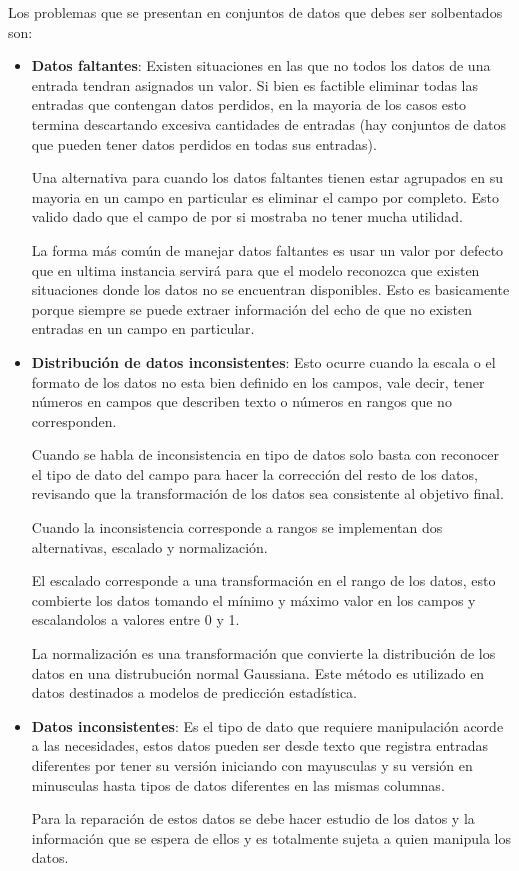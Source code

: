\documentclass[letter,12pt]{report}
\begin{document}
Los problemas que se presentan en conjuntos de datos que debes ser solbentados son:
\begin{itemize}
    \item \textbf{Datos faltantes}: Existen situaciones en las que no todos los datos de una
        entrada tendran asignados un valor. Si bien es factible eliminar todas las
        entradas que contengan datos perdidos, en la mayoria de los casos esto termina
        descartando excesiva cantidades de entradas (hay conjuntos de datos que pueden
        tener datos perdidos en todas sus entradas).

        Una alternativa para cuando los datos faltantes tienen estar agrupados en su
        mayoria en un campo en particular es eliminar el campo por completo. Esto valido
        dado que el campo de por si mostraba no tener mucha utilidad.

        La forma más común de manejar datos faltantes es usar un valor por defecto que en
        ultima instancia servirá para que el modelo reconozca que existen situaciones
        donde los datos no se encuentran disponibles. Esto es basicamente porque siempre
        se puede extraer información del echo de que no existen entradas en un campo en
        particular.
    \item \textbf{Distribución de datos inconsistentes}: Esto ocurre cuando la escala o
        el formato de los datos no esta bien definido en los campos, vale decir, tener
        números en campos que describen texto o números en rangos que no corresponden.

        Cuando se habla de inconsistencia en tipo de datos solo basta con reconocer el
        tipo de dato del campo para hacer la corrección del resto de los datos, revisando
        que la transformación de los datos sea consistente al objetivo final.

        Cuando la inconsistencia corresponde a rangos se implementan dos alternativas,
        escalado y normalización.

        El escalado corresponde a una transformación en el rango de los datos, esto
        combierte los datos tomando el mínimo y máximo valor en los campos y escalandolos
        a valores entre 0 y 1.

        La normalización es una transformación que convierte la distribución de los datos
        en una distrubución normal Gaussiana. Este método es utilizado en datos
        destinados a modelos de predicción estadística.
    \item \textbf{Datos inconsistentes}: Es el tipo de dato que requiere manipulación
        acorde a las necesidades, estos datos pueden ser desde texto que registra
        entradas diferentes por tener su versión iniciando con mayusculas y su versión en
        minusculas hasta tipos de datos diferentes en las mismas columnas.

        Para la reparación de estos datos se debe hacer estudio de los datos y la
        información que se espera de ellos y es totalmente sujeta a quien manipula los
        datos.
\end{itemize}
\end{document}
